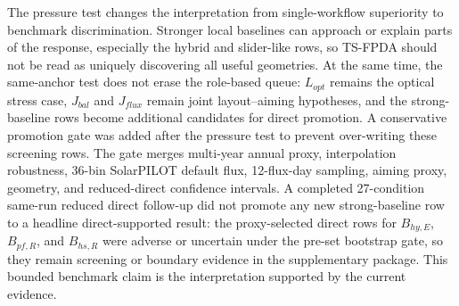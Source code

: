 \documentclass[final,3p,times]{elsarticle}
\begin{document}
The pressure test changes the interpretation from single-workflow superiority to benchmark discrimination. Stronger local baselines can approach or explain parts of the response, especially the hybrid and slider-like rows, so TS-FPDA should not be read as uniquely discovering all useful geometries. At the same time, the same-anchor test does not erase the role-based queue: $L_{opt}$ remains the optical stress case, $J_{bal}$ and $J_{flux}$ remain joint layout--aiming hypotheses, and the strong-baseline rows become additional candidates for direct promotion. A conservative promotion gate was added after the pressure test to prevent over-writing these screening rows. The gate merges multi-year annual proxy, interpolation robustness, 36-bin SolarPILOT default flux, 12-flux-day sampling, aiming proxy, geometry, and reduced-direct confidence intervals. A completed 27-condition same-run reduced direct follow-up did not promote any new strong-baseline row to a headline direct-supported result: the proxy-selected direct rows for $B_{hy,E}$, $B_{pf,R}$, and $B_{hs,R}$ were adverse or uncertain under the pre-set bootstrap gate, so they remain screening or boundary evidence in the supplementary package. This bounded benchmark claim is the interpretation supported by the current evidence.
\end{document}
